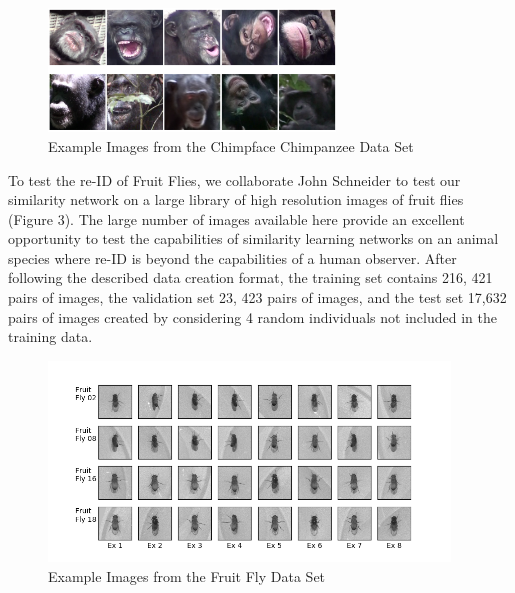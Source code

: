 \documentclass[11pt]{article}
\begin{document}
\begin{figure}
  \begin{flushright}
    \includegraphics[width=3in]{ChimpanzeeExamples.png}
  \end{flushright}
  \caption{Example Images from the Chimpface Chimpanzee Data Set}
\end{figure}

\noindent
To test the re-ID of Fruit Flies, we collaborate John Schneider to test our similarity network on a large library of high resolution images of fruit flies \cite{schneider2018can} (Figure 3). The large number of images available here provide an excellent opportunity to test the capabilities of similarity learning networks on an animal species where re-ID is beyond the capabilities of a human observer. After following the described data creation format, the training set contains 216, 421 pairs of images, the validation set 23, 423 pairs of images, and the test set 17,632 pairs of images created by considering 4 random individuals not included in the training data.  
\newline

\begin{figure}
  \begin{flushright}
    \includegraphics[width=4.2in]{FruitFlyExamples.png}
  \end{flushright}
  \caption{Example Images from the Fruit Fly Data Set}
\end{figure}
\end{document}

